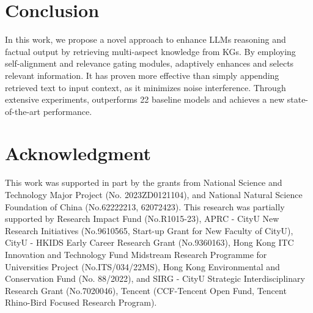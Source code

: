 \section{Conclusion}
In this work, we propose a novel approach to enhance LLMs reasoning and factual output by retrieving multi-aspect knowledge from KGs. By employing self-alignment and relevance gating modules, \model adaptively enhances and selects relevant information. 
It has proven more effective than simply appending retrieved text to input context, as it minimizes noise interference. Through extensive experiments, \model outperforms 22 baseline models and achieves a new state-of-the-art performance.

\section{Acknowledgment}
This work was supported in part by the grants from National Science and Technology Major Project (No. 2023ZD0121104), and National Natural Science Foundation of China (No.62222213, 62072423).
This research was partially supported by Research Impact Fund (No.R1015-23), APRC - CityU New Research Initiatives (No.9610565, Start-up Grant for New Faculty of CityU), CityU - HKIDS Early Career Research Grant (No.9360163), Hong Kong ITC Innovation and Technology Fund Midstream Research Programme for Universities Project (No.ITS/034/22MS), Hong Kong Environmental and Conservation Fund (No. 88/2022), and SIRG - CityU Strategic Interdisciplinary Research Grant (No.7020046), Tencent (CCF-Tencent Open Fund, Tencent Rhino-Bird Focused Research Program).